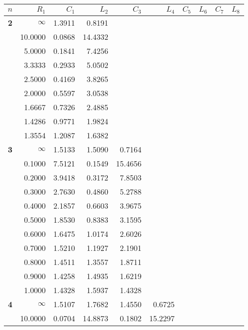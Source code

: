 \clearpage 
\begin{table}[!htb]
\begin{center}
{\tiny
\begin{tabular}{|c||r|r|r|r|r|r|r|r|r|}\hline
$n$ & $R_1$   & $C_1$ & $L_2$ & $C_3$ & $L_4$ & $C_5$ & $L_6$ & $C_7$ & $L_8$\\ \hline\hline
\textbf{ 2}&$\infty$&1.3911&0.8191&     &     &     &     &     &     \\
&10.0000&0.0868&14.4332&     &     &     &     &     &     \\
&5.0000&0.1841&7.4256&     &     &     &     &     &     \\
&3.3333&0.2933&5.0502&     &     &     &     &     &     \\
&2.5000&0.4169&3.8265&     &     &     &     &     &     \\
&2.0000&0.5597&3.0538&     &     &     &     &     &     \\
&1.6667&0.7326&2.4885&     &     &     &     &     &     \\
&1.4286&0.9771&1.9824&     &     &     &     &     &     \\
&1.3554&1.2087&1.6382&     &     &     &     &     &     \\ \hline
\textbf{ 3}&$\infty$&1.5133&1.5090&0.7164&     &     &     &     &     \\
&0.1000&7.5121&0.1549&15.4656&     &     &     &     &     \\
&0.2000&3.9418&0.3172&7.8503&     &     &     &     &     \\
&0.3000&2.7630&0.4860&5.2788&     &     &     &     &     \\
&0.4000&2.1857&0.6603&3.9675&     &     &     &     &     \\
&0.5000&1.8530&0.8383&3.1595&     &     &     &     &     \\
&0.6000&1.6475&1.0174&2.6026&     &     &     &     &     \\
&0.7000&1.5210&1.1927&2.1901&     &     &     &     &     \\
&0.8000&1.4511&1.3557&1.8711&     &     &     &     &     \\
&0.9000&1.4258&1.4935&1.6219&     &     &     &     &     \\
&1.0000&1.4328&1.5937&1.4328&     &     &     &     &     \\ \hline
\textbf{ 4}&$\infty$&1.5107&1.7682&1.4550&0.6725&     &     &     &     \\
&10.0000&0.0704&14.8873&0.1802&15.2297&     &     &     &     \\

\end{tabular}}
\end{center}
\end{table}
